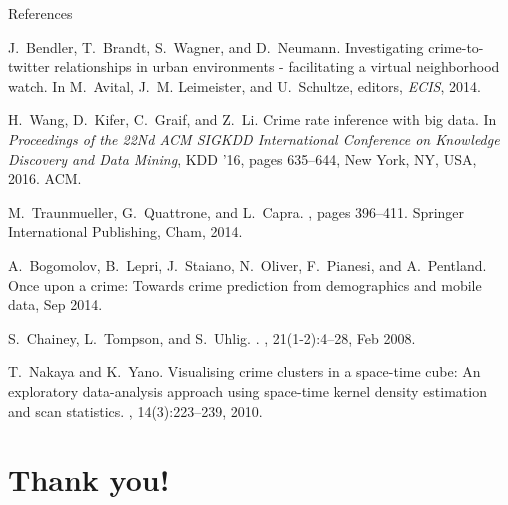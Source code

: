 \documentclass[10pt,ignorenonframetext,]{beamer}
\begin{document}
\begin{frame}{References}

\begin{thebibliography}{1}

J.~Bendler, T.~Brandt, S.~Wagner, and D.~Neumann.
\newblock Investigating crime-to-twitter relationships in urban environments -
  facilitating a virtual neighborhood watch.
\newblock In M.~Avital, J.~M. Leimeister, and U.~Schultze, editors, {\em ECIS},
  2014.

H.~Wang, D.~Kifer, C.~Graif, and Z.~Li.
\newblock Crime rate inference with big data.
\newblock In {\em Proceedings of the 22Nd ACM SIGKDD International Conference
  on Knowledge Discovery and Data Mining}, KDD '16, pages 635--644, New York,
  NY, USA, 2016. ACM.

M.~Traunmueller, G.~Quattrone, and L.~Capra.
, pages 396--411.
\newblock Springer International Publishing, Cham, 2014.
\end{thebibliography}

\end{frame}

\begin{frame}

\begin{thebibliography}{1}
A.~Bogomolov, B.~Lepri, J.~Staiano, N.~Oliver, F.~Pianesi, and A.~Pentland.
\newblock Once upon a crime: Towards crime prediction from demographics and
  mobile data, Sep 2014.

S.~Chainey, L.~Tompson, and S.~Uhlig.
.
, 21(1-2):4--28, Feb 2008.

T.~Nakaya and K.~Yano.
\newblock Visualising crime clusters in a space-time cube: An exploratory
  data-analysis approach using space-time kernel density estimation and scan
  statistics.
, 14(3):223--239, 2010.
\end{thebibliography}

\end{frame}

\section{Thank you!}\label{thank-you}
\end{document}

